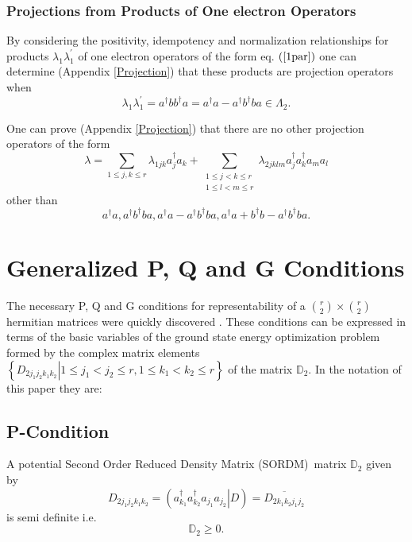 \documentclass[aps,preprint]{revtex4}%
\begin{document}
\subsubsection{Projections from Products of One electron Operators}

By considering the positivity, idempotency and normalization relationships for
products $\lambda_{1}\lambda_{1}^{\prime}$ of one electron operators of the
form eq. $\left(  \ref{1par}\right)  $ one can determine (Appendix
\ref{Projection}) that these products are projection operators when
\begin{equation}
\lambda_{1}\lambda_{1}^{\prime}=a^{\dagger}bb^{\dagger}a=a^{\dagger
}a-a^{\dagger}b^{\dagger}ba\in\Lambda_{2}.
\end{equation}


One can prove (Appendix \ref{Projection}) that there are no other projection
operators of the form
\begin{equation}
\lambda=\sum_{1\leq j,k\leq r}\lambda_{1jk}a_{j}^{\dagger}a_{k}+\sum
_{\substack{1\leq j<k\leq r\\1\leq l<m\leq r}}\lambda_{2jklm}a_{j}^{\dagger
}a_{k}^{\dagger}a_{m}a_{l}%
\end{equation}
other than
\begin{equation}
a^{\dagger}a,a^{\dagger}b^{\dagger}ba,a^{\dagger}a-a^{\dagger}b^{\dagger
}ba,a^{\dagger}a+b^{\dagger}b-a^{\dagger}b^{\dagger}ba.
\end{equation}


\section{Generalized P, Q and G Conditions \label{PQG}}

The necessary P, Q and G conditions for representability of a $\binom{r}%
{2}\times\binom{r}{2}$ hermitian matrices were quickly discovered \cite{PQG}.
These conditions can be expressed in terms of the basic variables of the
ground state energy optimization problem formed by the complex matrix elements
$\left\{  \left.  D_{2j_{1}j_{2}k_{1}k_{2}}\right\vert 1\leq j_{1}<j_{2}\leq
r,1\leq k_{1}<k_{2}\leq r\right\}  $ of the matrix $\mathbb{D}_{2}$. In the
notation of this paper they are:

\subsection{P-Condition}

A potential Second Order Reduced Density Matrix (SORDM)\ matrix $\mathbb{D}%
_{2}$ given by
\begin{equation}
D_{2j_{1}j_{2}k_{1}k_{2}}=\left(  \left.  a_{k_{1}}^{\dagger}a_{k_{2}%
}^{\dagger}a_{j_{1}}a_{j_{2}}\right\vert D\right)  =\overline{D_{2k_{1}%
k_{2}j_{1}j_{2}}}%
\end{equation}
is semi definite i.e.
\begin{equation}
\mathbb{D}_{2}\geq0.
\end{equation}
\end{document}
